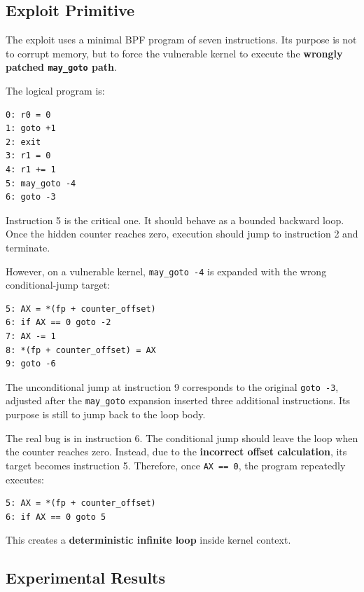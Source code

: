 \documentclass[../main.tex]{subfiles}
\begin{document}
\subsection{Exploit Primitive}

The exploit uses a minimal BPF program of seven instructions. Its purpose is not to corrupt memory, but to force the vulnerable kernel to execute the \textbf{wrongly patched \texttt{may\_goto} path}.

The logical program is:

\begin{lstlisting}[caption={Minimal exploit structure.}]
0: r0 = 0
1: goto +1
2: exit
3: r1 = 0
4: r1 += 1
5: may_goto -4
6: goto -3
\end{lstlisting}

Instruction 5 is the critical one. It should behave as a bounded backward loop. Once the hidden counter reaches zero, execution should jump to instruction 2 and terminate.

However, on a vulnerable kernel, \texttt{may\_goto -4} is expanded with the wrong conditional-jump target:

\begin{lstlisting}[caption={Buggy runtime expansion.}]
5: AX = *(fp + counter_offset)
6: if AX == 0 goto -2
7: AX -= 1
8: *(fp + counter_offset) = AX
9: goto -6
\end{lstlisting}

The unconditional jump at instruction 9 corresponds to the original \texttt{goto -3}, adjusted after the \texttt{may\_goto} expansion inserted three additional instructions. Its purpose is still to jump back to the loop body.

The real bug is in instruction 6. The conditional jump should leave the loop when the counter reaches zero. Instead, due to the \textbf{incorrect offset calculation}, its target becomes instruction 5. Therefore, once \texttt{AX == 0}, the program repeatedly executes:

\begin{lstlisting}
5: AX = *(fp + counter_offset)
6: if AX == 0 goto 5
\end{lstlisting}

This creates a \textbf{deterministic infinite loop} inside kernel context.

\subsection{Experimental Results}
\end{document}
